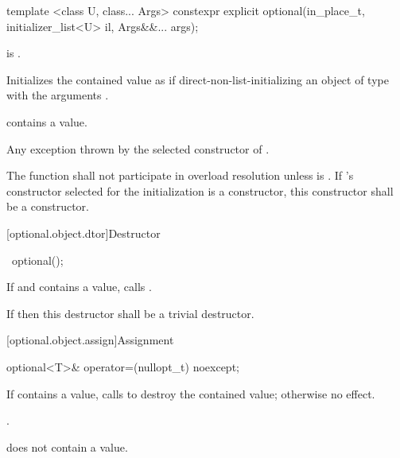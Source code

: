 \begin{itemdecl}
template <class U, class... Args>
  constexpr explicit optional(in_place_t, initializer_list<U> il, Args&&... args);
\end{itemdecl}

\begin{itemdescr}

\pnum
\requires
{} is .

\pnum
\effects
Initializes the contained value as if direct-non-list-initializing an object of type  with the arguments .

\pnum
\postcondition
{} contains a value.

\pnum
\throws
Any exception thrown by the selected constructor of .

\pnum
\remarks
The function shall not participate in overload resolution unless  is .
If 's constructor selected for the initialization is a  constructor, this constructor shall be a  constructor.
\end{itemdescr}

[optional.object.dtor]{Destructor}

%
\begin{itemdecl}
~optional();
\end{itemdecl}

\begin{itemdescr}
\pnum
\effects
If  and  contains a value, calls .

\pnum
\remarks
If  then this destructor shall be a trivial destructor.
\end{itemdescr}

[optional.object.assign]{Assignment}

%
%
\begin{itemdecl}
optional<T>& operator=(nullopt_t) noexcept;
\end{itemdecl}

\begin{itemdescr}
\pnum
\effects
If  contains a value, calls  to destroy the contained value; otherwise no effect.

\pnum
\returns
{}.

\pnum
\postcondition
{} does not contain a value.
\end{itemdescr}

